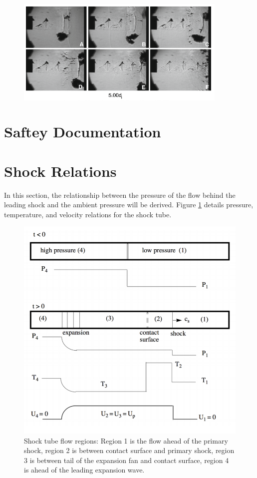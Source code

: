 \begin{figure}[h] 
	\centering
	\includegraphics[width=0.9\textwidth]{mariani5.PNG} 
	\caption{\cite{mariani2013a}}
\end{figure}

\section{Saftey Documentation} \label{app:safety}



\section{Shock Relations} \label{app:shock}
In this section, the relationship between the pressure of the flow behind the leading shock and the ambient pressure will be derived. Figure \ref{fig:shock} details pressure, temperature, and velocity relations for the shock tube.
\begin{figure}[H]
	\centering
	\includegraphics[scale=0.5]{figshock.png} 
	\caption{Shock tube flow regions: Region 1 is the flow ahead of the primary shock, region 2 is between contact surface and primary shock, region 3 is between tail of the expansion fan and contact surface, region 4 is ahead of the leading expansion wave.\cite{cantwell2017}}
	\label{fig:shock}
\end{figure}

